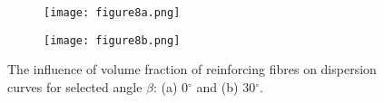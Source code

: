 \documentclass[preprint,12pt]{elsarticle}
\providecommand{\DIFaddbeginFL}{} %
\providecommand{\DIFaddendFL}{} %
\providecommand{\DIFdelbeginFL}{} %
\providecommand{\DIFdelendFL}{} %
\begin{document}
\begin{figure} [h!]
	\centering
	\DIFdelbeginFL %
\DIFdelendFL %
	\begin{subfigure}[b]{0.49\textwidth}
		\centering
		\DIFdelbeginFL %
\DIFdelendFL \DIFaddbeginFL \texttt{[image: figure8a.png]}
		\DIFaddendFL \caption{}
		\label{fig:vol0}
	\end{subfigure}
	\hfill
	\begin{subfigure}[b]{0.49\textwidth}
		\centering
		\DIFdelbeginFL %
\DIFdelendFL \DIFaddbeginFL \texttt{[image: figure8b.png]}
		\DIFaddendFL \caption{}
		\label{fig:vol30}
	\end{subfigure}
	\caption{The influence of volume fraction of reinforcing fibres on dispersion curves for selected angle $\beta$: (a) 0$^{\circ}$ and (b) 30$^{\circ}$.} 
	\label{fig:vol}
\end{figure}
\end{document}
